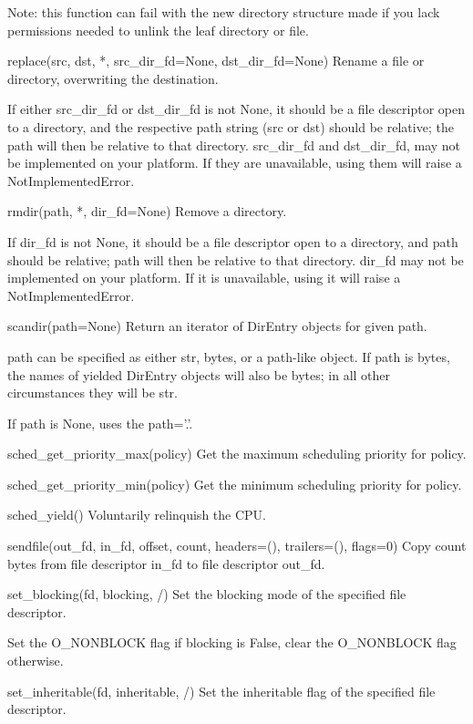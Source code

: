 \documentclass{article}
\begin{document}
        Note: this function can fail with the new directory structure made
        if you lack permissions needed to unlink the leaf directory or
        file.

    replace(src, dst, *, src_dir_fd=None, dst_dir_fd=None)
        Rename a file or directory, overwriting the destination.

        If either src_dir_fd or dst_dir_fd is not None, it should be a file
          descriptor open to a directory, and the respective path string (src or dst)
          should be relative; the path will then be relative to that directory.
        src_dir_fd and dst_dir_fd, may not be implemented on your platform.
          If they are unavailable, using them will raise a NotImplementedError.

    rmdir(path, *, dir_fd=None)
        Remove a directory.

        If dir_fd is not None, it should be a file descriptor open to a directory,
          and path should be relative; path will then be relative to that directory.
        dir_fd may not be implemented on your platform.
          If it is unavailable, using it will raise a NotImplementedError.

    scandir(path=None)
        Return an iterator of DirEntry objects for given path.

        path can be specified as either str, bytes, or a path-like object.  If path
        is bytes, the names of yielded DirEntry objects will also be bytes; in
        all other circumstances they will be str.

        If path is None, uses the path='.'.

    sched_get_priority_max(policy)
        Get the maximum scheduling priority for policy.

    sched_get_priority_min(policy)
        Get the minimum scheduling priority for policy.

    sched_yield()
        Voluntarily relinquish the CPU.

    sendfile(out_fd, in_fd, offset, count, headers=(), trailers=(), flags=0)
        Copy count bytes from file descriptor in_fd to file descriptor out_fd.

    set_blocking(fd, blocking, /)
        Set the blocking mode of the specified file descriptor.

        Set the O_NONBLOCK flag if blocking is False,
        clear the O_NONBLOCK flag otherwise.

    set_inheritable(fd, inheritable, /)
        Set the inheritable flag of the specified file descriptor.
\end{document}
